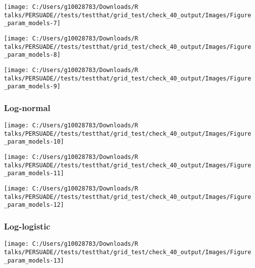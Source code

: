 \documentclass[
]{article}
\begin{document}
\begin{flushleft}\texttt{[image: C:/Users/g10028783/Downloads/R talks/PERSUADE//tests/testthat/grid\_test/check\_40\_output/Images/Figure\_param\_models-7]} \end{flushleft}

\begin{flushleft}\texttt{[image: C:/Users/g10028783/Downloads/R talks/PERSUADE//tests/testthat/grid\_test/check\_40\_output/Images/Figure\_param\_models-8]} \end{flushleft}

\begin{flushleft}\texttt{[image: C:/Users/g10028783/Downloads/R talks/PERSUADE//tests/testthat/grid\_test/check\_40\_output/Images/Figure\_param\_models-9]} \end{flushleft}

\clearpage

\subsubsection{Log-normal}\label{log-normal}

\begin{flushleft}\texttt{[image: C:/Users/g10028783/Downloads/R talks/PERSUADE//tests/testthat/grid\_test/check\_40\_output/Images/Figure\_param\_models-10]} \end{flushleft}

\begin{flushleft}\texttt{[image: C:/Users/g10028783/Downloads/R talks/PERSUADE//tests/testthat/grid\_test/check\_40\_output/Images/Figure\_param\_models-11]} \end{flushleft}

\begin{flushleft}\texttt{[image: C:/Users/g10028783/Downloads/R talks/PERSUADE//tests/testthat/grid\_test/check\_40\_output/Images/Figure\_param\_models-12]} \end{flushleft}

\clearpage

\subsubsection{Log-logistic}\label{log-logistic}

\begin{flushleft}\texttt{[image: C:/Users/g10028783/Downloads/R talks/PERSUADE//tests/testthat/grid\_test/check\_40\_output/Images/Figure\_param\_models-13]} \end{flushleft}
\end{document}

